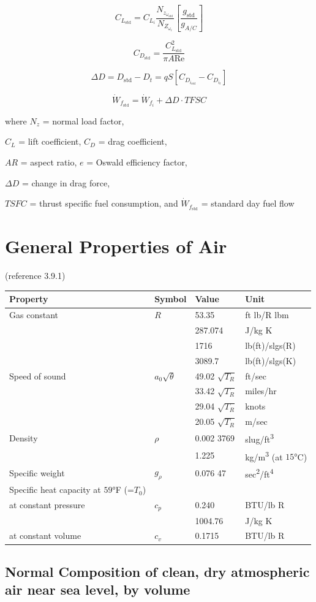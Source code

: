 \documentclass[
]{book}
\begin{document}
\[C_{L_{\mathrm{std}}} = C_{L_i} \frac{N_{z_{\omega_{\mathrm{std}}}}}{N_{Z_{\omega_i}}} \left[\frac{g_{\mathrm{std}}}{g_{A/C}} \right] \]

\[C_{D_{\mathrm{std}}} = \frac{C^2_{L_{\mathrm{std}}}}{\pi A \text{Re}} \]

\[\Delta D = D_{\mathrm{std}} - D_t = qS\left[C_{D_{i_{\mathrm{std}}}} - C_{D_{i_t}} \right] \]

\[\dot{W}_{f_{\mathrm{std}}} = \dot{W}_{f_i} + \Delta D \cdot TFSC \]

where \(N_z\) = normal load factor,

\(C_L\) = lift coefficient, \(C_D\) = drag coefficient,

\(AR\) = aspect ratio, \(e\) = Oswald efficiency factor,

\(\Delta D\) = change in drag force,

\(TSFC\) = thrust specific fuel consumption, and
\(\dot{W}_{f_{\mathrm{std}}}\) = standard day fuel flow

\hypertarget{general-properties-of-air}{%
\section{General Properties of Air}\label{general-properties-of-air}}

(reference 3.9.1)

\begin{longtable}[]{@{}llll@{}}
\toprule
Property & Symbol & Value & Unit\tabularnewline
\midrule
\endhead
Gas constant & \(R\) & 53.35 & ft lb/R lbm\tabularnewline
& & 287.074 & J/kg K\tabularnewline
& & 1716 & lb(ft)/slgs(R)\tabularnewline
& & 3089.7 & lb(ft)/slgs(K)\tabularnewline
Speed of sound & \(a_0 \sqrt{\theta}\) & 49.02 \(\sqrt{T_R}\) & ft/sec\tabularnewline
& & 33.42 \(\sqrt{T_R}\) & miles/hr\tabularnewline
& & 29.04 \(\sqrt{T_R}\) & knots\tabularnewline
& & 20.05 \(\sqrt{T_R}\) & m/sec\tabularnewline
Density & \(\rho\) & 0.002 3769 & slug/ft\textsuperscript{3}\tabularnewline
& & 1.225 & kg/m\textsuperscript{3} (at \(15°\)C)\tabularnewline
Specific weight & \(g_\rho\) & 0.076 47 & sec\textsuperscript{2}/ft\textsuperscript{4}\tabularnewline
Specific heat capacity at \(59°\)F (=\(T_0\)) & & &\tabularnewline
at constant pressure & \(c_p\) & 0.240 & BTU/lb R\tabularnewline
& & 1004.76 & J/kg K\tabularnewline
at constant volume & \(c_v\) & 0.1715 & BTU/lb R\tabularnewline
\bottomrule
\end{longtable}

\hypertarget{normal-composition-of-clean-dry-atmospheric-air-near-sea-level-by-volume}{%
\subsection*{Normal Composition of clean, dry atmospheric air near sea level, by volume}\label{normal-composition-of-clean-dry-atmospheric-air-near-sea-level-by-volume}}
\end{document}
